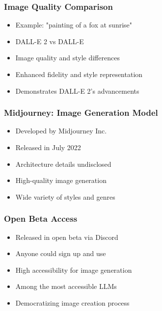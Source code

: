 \begin{frame}[fragile]\frametitle{Image Quality Comparison}
    
    \begin{itemize}
        \item Example: "painting of a fox at sunrise"
        \item DALL-E 2 vs DALL-E
        \item Image quality and style differences
        \item Enhanced fidelity and style representation
        \item Demonstrates DALL-E 2's advancements
    \end{itemize}
\end{frame}

\begin{frame}[fragile]\frametitle{Midjourney: Image Generation Model}
    
    \begin{itemize}
        \item Developed by Midjourney Inc.
        \item Released in July 2022
        \item Architecture details undisclosed
        \item High-quality image generation
        \item Wide variety of styles and genres
    \end{itemize}
	
\end{frame}

\begin{frame}[fragile]\frametitle{Open Beta Access}
    
    \begin{itemize}
        \item Released in open beta via Discord
        \item Anyone could sign up and use
        \item High accessibility for image generation
        \item Among the most accessible LLMs
        \item Democratizing image creation process
    \end{itemize}
\end{frame}

